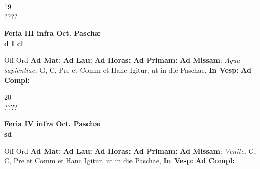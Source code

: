 \documentclass[10pt, openany]{book}
\begin{document}
    \begin{center}
        \begin{minipage}{3.5in}
            \vspace{2em}
            \begin{minipage}{0.5in}
                {\Huge 19} \\
                {\normalsize ????}
            \end{minipage}
            \begin{minipage}{3.0in}
                \textbf{ \large Feria III infra Oct. Paschæ \\
                \textnormal{\normalsize d I cl}}

            \end{minipage}
            \begin{justify}Off Ord
                \textbf{Ad Mat: }
                \textbf{Ad Lau: }
                \textbf{Ad Horas: }
                \textbf{Ad Primam: }\textbf{Ad Missam}: \textit{Aqua sapientiae,} G, C, Pre et Comm et Hanc Igitur, ut in die Paschae, 
                \textbf{In Vesp: }
                \textbf{Ad Compl: }
            \end{justify}
        \end{minipage}
    \end{center}

    \begin{center}
        \begin{minipage}{3.5in}
            \vspace{2em}
            \begin{minipage}{0.5in}
                {\Huge 20} \\
                {\normalsize ????}
            \end{minipage}
            \begin{minipage}{3.0in}
                \textbf{ \large Feria IV infra Oct. Paschæ \\
                \textnormal{\normalsize sd}}

            \end{minipage}
            \begin{justify}Off Ord
                \textbf{Ad Mat: }
                \textbf{Ad Lau: }
                \textbf{Ad Horas: }
                \textbf{Ad Primam: }\textbf{Ad Missam}: \textit{Venite,} G, C, Pre et Comm et Hanc Igitur, ut in die Paschae, 
                \textbf{In Vesp: }
                \textbf{Ad Compl: }
            \end{justify}
        \end{minipage}
    \end{center}
\end{document}
